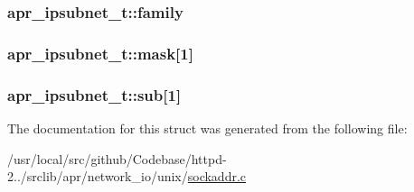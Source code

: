 \subsubsection[{\texorpdfstring{family}{family}}]{ apr\+\_\+ipsubnet\+\_\+t\+::family}\hypertarget{structapr__ipsubnet__t_ab8b055c0e0513020c419fc984b0d7d65}{}\label{structapr__ipsubnet__t_ab8b055c0e0513020c419fc984b0d7d65}
\subsubsection[{\texorpdfstring{mask}{mask}}]{ apr\+\_\+ipsubnet\+\_\+t\+::mask\mbox{[}1\mbox{]}}\hypertarget{structapr__ipsubnet__t_a8c7ee5affd8e1d91f6aaf9dd5ffc2437}{}\label{structapr__ipsubnet__t_a8c7ee5affd8e1d91f6aaf9dd5ffc2437}
\subsubsection[{\texorpdfstring{sub}{sub}}]{ apr\+\_\+ipsubnet\+\_\+t\+::sub\mbox{[}1\mbox{]}}\hypertarget{structapr__ipsubnet__t_a81064d3992054724c6715ae119226c56}{}\label{structapr__ipsubnet__t_a81064d3992054724c6715ae119226c56}


The documentation for this struct was generated from the following file\+:\begin{DoxyCompactItemize}
\item 
/usr/local/src/github/\+Codebase/httpd-\/2../srclib/apr/network\+\_\+io/unix/\hyperlink{unix_2sockaddr_8c}{sockaddr.\+c}\end{DoxyCompactItemize}
